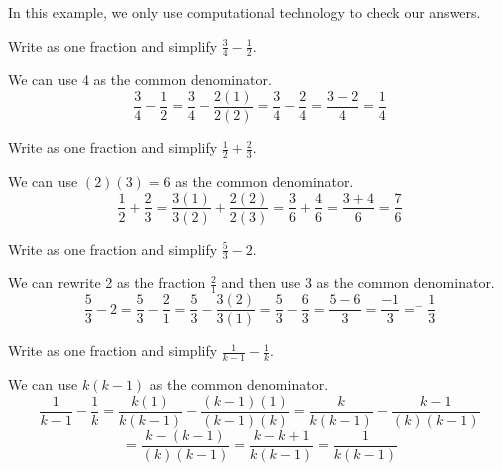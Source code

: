 \begin{exam} 
\label{fraction arithmetic} 
    In this example, we only use computational technology to check our answers. 
    \begin{apart}
        \item Write as one fraction and simplify $\displaystyle \frac{3}{4} - \frac{1}{2}.$
            \begin{soln}
                We can use 4 as the common denominator.
                $$\displaystyle \frac{3}{4} - \frac{1}{2}
                = \frac{3}{4} - \frac{2(1)}{2(2)}
                = \frac{3}{4} - \frac{2}{4}
                = \frac{3-2}{4}
                = \frac{1}{4}
                $$
            \end{soln}
        \item Write as one fraction and simplify $\displaystyle \frac{1}{2} + \frac{2}{3}.$  
            \begin{soln}
                We can use $(2)(3) = 6$ as the common denominator.
                 $$\displaystyle \frac{1}{2} + \frac{2}{3}
                = \frac{3(1)}{3(2)} + \frac{2(2)}{2(3)}
                = \frac{3}{6} + \frac{4}{6}
                = \frac{3+4}{6}
                = \frac{7}{6}
                $$               
            \end{soln}
        \item Write as one fraction and simplify
        $\displaystyle \frac{5}{3}-2.$
            \begin{soln}
                We can rewrite 2 as the fraction $\frac{2}{1}$ and then use 3 as the common denominator.
                $$ \displaystyle \frac{5}{3}-2
                = \frac{5}{3}-\frac{2}{1}
                = \frac{5}{3}-\frac{3(2)}{3(1)}
                = \frac{5}{3}-\frac{6}{3}
                = \frac{5-6}{3}
                = \frac{-1}{3}
                =^-\frac{1}{3}
                $$
            \end{soln}
        \item Write as one fraction and simplify
        $\displaystyle \frac{1}{k-1} - \frac{1}{k}.$
            \begin{soln}
                We can use $k(k-1)$ as the common denominator.
                $$\displaystyle \frac{1}{k-1} - \frac{1}{k} 
                = \frac{k(1)}{k(k-1)} - \frac{(k-1)(1)}{(k-1)(k)} 
                = \frac{k}{k(k-1)} - \frac{k-1}{(k)(k-1)}$$
                $$ 
                = \frac{k-(k-1)}{(k)(k-1)} 
                = \frac{k-k+1}{k(k-1)} 
                = \frac{1}{k(k-1)} 
                $$


\end{soln}
\end{apart}
\end{exam}
